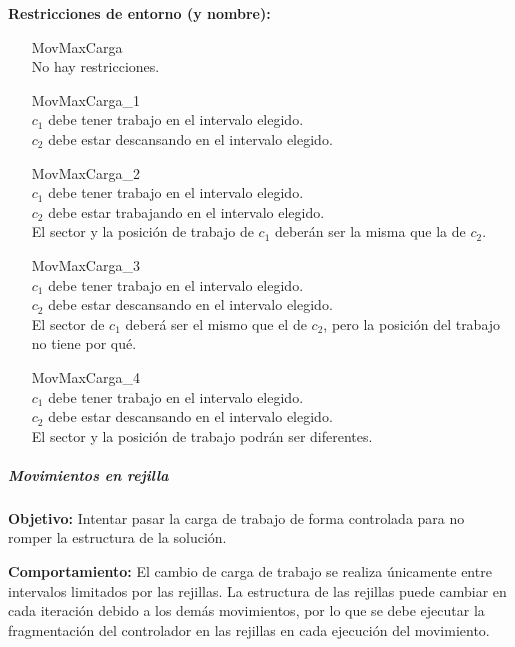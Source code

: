 \textbf{Restricciones de entorno (y nombre):}
\begin{enumerate}[align=parleft, labelsep=2cm, itemindent=5em, font=\itshape]
    \item[MovMaxCarga]\mbox{}\\No hay restricciones.

    \item[MovMaxCarga\_1]\mbox{}\\
    $c_1$ debe tener trabajo en el intervalo elegido. \\
    $c_2$ debe estar descansando en el intervalo elegido.

    \item[MovMaxCarga\_2]\mbox{}\\
    $c_1$ debe tener trabajo en el intervalo elegido. \\
    $c_2$ debe estar trabajando en el intervalo elegido. \\
    El sector y la posición de trabajo de $c_1$ deberán ser la misma que la de $c_2$.

    \item[MovMaxCarga\_3]\mbox{}\\
    $c_1$ debe tener trabajo en el intervalo elegido. \\
    $c_2$ debe estar descansando en el intervalo elegido. \\
    El sector de $c_1$ deberá ser el mismo que el de $c_2$, pero la posición del trabajo no tiene por qué.

    \item[MovMaxCarga\_4]\mbox{}\\
    $c_1$ debe tener trabajo en el intervalo elegido. \\
    $c_2$ debe estar descansando en el intervalo elegido. \\
    El sector y la posición de trabajo podrán ser diferentes.
\end{enumerate}

\subparagraph{Movimientos en rejilla}
\label{entorno:movRejilla}

\textbf{Objetivo:} Intentar pasar la carga de trabajo de forma controlada para no romper la estructura de la solución.

\textbf{Comportamiento:} El cambio de carga de trabajo se realiza únicamente entre intervalos limitados por las rejillas. La estructura de las rejillas puede cambiar en cada iteración debido a los demás movimientos, por lo que se debe ejecutar la fragmentación del controlador en las rejillas en cada ejecución del movimiento.

